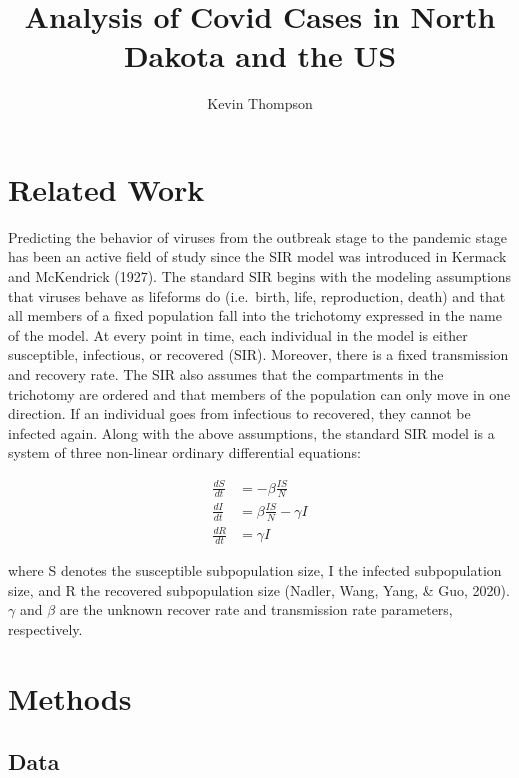 \documentclass[
  english,
  doc]{apa6}
\title{Analysis of Covid Cases in North Dakota and the US}
\author{Kevin Thompson\textsuperscript{}}
\date{}
\affiliation{\vspace{0.5cm}\textsuperscript{} Southern Methodist University Data Science Program}
\begin{document}
\maketitle

\hypertarget{related-work}{%
\section{Related Work}\label{related-work}}

Predicting the behavior of viruses from the outbreak stage to the pandemic stage
has been an active field of study since the SIR model was introduced
in Kermack and McKendrick (1927). The standard SIR begins with the modeling assumptions that viruses
behave as lifeforms do (i.e.~birth, life, reproduction, death) and that all members
of a fixed population fall into the trichotomy expressed in the name of the model.
At every point in time, each individual in the model is either susceptible,
infectious, or recovered (SIR). Moreover, there is a fixed transmission and recovery rate. The SIR also assumes that the compartments in the trichotomy are ordered and that members of the population can only move in one direction. If an individual goes from infectious to recovered, they cannot be infected again.
Along with the above assumptions, the standard SIR model is a system of three
non-linear ordinary differential equations:

\begin{align}
  \frac{dS}{dt} &= -\beta\frac{IS}{N} \\
  \frac{dI}{dt} &= \beta\frac{IS}{N}-\gamma{I} \\
  \frac{dR}{dt} &= \gamma{I}
\end{align}

where S denotes the susceptible subpopulation size, I the infected subpopulation
size, and R the recovered subpopulation size (Nadler, Wang, Yang, \& Guo, 2020). \(\gamma\) and \(\beta\) are the
unknown recover rate and transmission rate parameters, respectively.

\hypertarget{methods}{%
\section{Methods}\label{methods}}

\hypertarget{data}{%
\subsection{Data}\label{data}}
\end{document}
